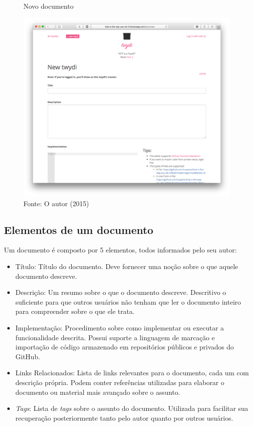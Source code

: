 \begin{figure}[h]
	\centering
    \caption{Novo documento}
    \includegraphics[width=15cm]{Imagens/print-new-twydi.png}
	\caption*{Fonte: O autor (2015)}
\end{figure}

\subsection{Elementos de um documento}

Um documento é composto por 5 elementos, todos informados pelo seu autor:

\begin{itemize}
  \item Título: Título do documento. Deve fornecer uma noção sobre o que aquele documento descreve.
  \item Descrição: Um resumo sobre o que o documento descreve. Descritivo o suficiente para que outros usuários não tenham que ler o documento inteiro para compreender sobre o que ele trata.
  \item Implementação: Procedimento sobre como implementar ou executar a funcionalidade descrita. Possui suporte a linguagem de marcação e importação de código armazenado em repositórios públicos e privados do GitHub.
  \item Links Relacionados: Lista de links relevantes para o documento, cada um com descrição própria. Podem conter referências utilizadas para elaborar o documento ou material mais avançado sobre o assunto.
  \item \textit{Tags}: Lista de \textit{tags} sobre o assunto do documento. Utilizada para facilitar sua recuperação posteriormente tanto pelo autor quanto por outros usuários.
\end{itemize}

